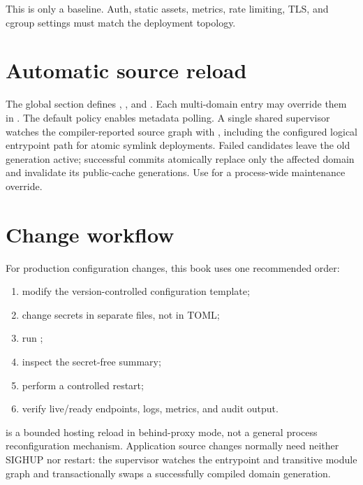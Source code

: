 This is only a baseline. Auth, static assets, metrics, rate limiting, TLS, and cgroup settings must match the deployment topology.


\section{Automatic source reload}

The global \code{[reload]} section defines , , and . Each multi-domain entry may override them in . The default policy enables metadata polling. A single shared supervisor watches the compiler-reported source graph with , including the configured logical entrypoint path for atomic symlink deployments. Failed candidates leave the old generation active; successful commits atomically replace only the affected domain and invalidate its public-cache generations. Use  for a process-wide maintenance override.

\section{Change workflow}

For production configuration changes, this book uses one recommended order:

\begin{enumerate}
  \item modify the version-controlled configuration template;
  \item change secrets in separate files, not in TOML;
  \item run ;
  \item inspect the secret-free  summary;
  \item perform a controlled restart;
  \item verify live/ready endpoints, logs, metrics, and audit output.
\end{enumerate}

 is a bounded hosting reload in behind-proxy mode, not a general process reconfiguration mechanism. Application source changes normally need neither SIGHUP nor restart: the \code{[reload]} supervisor watches the entrypoint and transitive module graph and transactionally swaps a successfully compiled domain generation.
